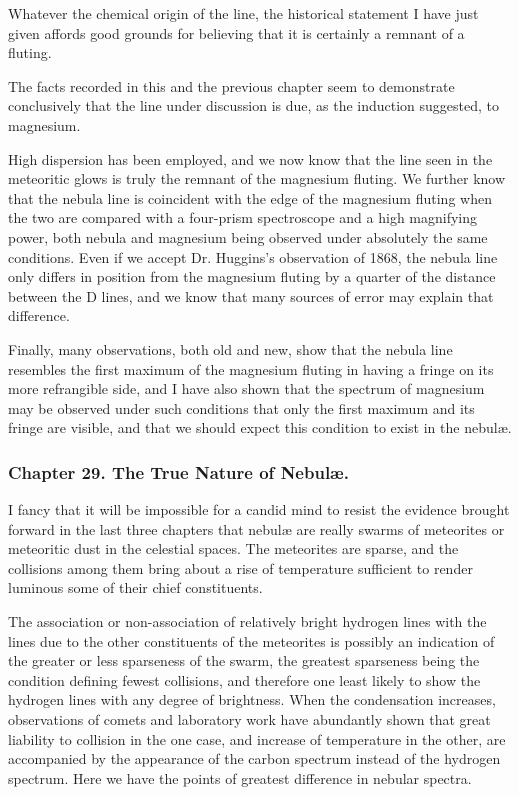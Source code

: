 \documentclass[a4paper, 12pt, oneside, polutonikogreek, english]{article}
\begin{document}
Whatever the chemical origin of the line, the historical statement I have just given affords good grounds for believing that it is certainly a remnant of a fluting.

The facts recorded in this and the previous chapter seem to demonstrate conclusively that the line under discussion is due, as the induction suggested, to magnesium.

High dispersion has been employed, and we now know that the line seen in the meteoritic glows is truly the remnant of the magnesium fluting. We further know that the nebula line is coincident with the edge of the magnesium fluting when the two are compared with a four-prism spectroscope and a high magnifying power, both nebula and magnesium being observed under absolutely the same conditions. Even if we accept Dr. Huggins's observation of 1868, the nebula line only differs in position from the magnesium fluting by a quarter of the distance between the D lines, and we know that many sources of error may explain that difference.

Finally, many observations, both old and new, show that the nebula line resembles the first maximum of the magnesium fluting in having a fringe on its more refrangible side, and I have also shown that the spectrum of magnesium may be observed under such conditions that only the first maximum and its fringe are visible, and that we should expect this condition to exist in the nebulæ.

\subsubsection{Chapter 29. The True Nature of Nebulæ.}

I fancy that it will be impossible for a candid mind to resist the evidence brought forward in the last three chapters that nebulæ are really swarms of meteorites or meteoritic dust in the celestial spaces. The meteorites are sparse, and the collisions among them bring about a rise of temperature sufficient to render luminous some of their chief constituents.

The association or non-association of relatively bright hydrogen lines with the lines due to the other constituents of the meteorites is possibly an indication of the greater or less sparseness of the swarm, the greatest sparseness being the condition defining fewest collisions, and therefore one least likely to show the hydrogen lines with any degree of brightness. When the condensation increases, observations of comets and laboratory work have abundantly shown that great liability to collision in the one case, and increase of temperature in the other, are accompanied by the appearance of the carbon spectrum instead of the hydrogen spectrum. Here we have the points of greatest difference in nebular spectra.
\end{document}
